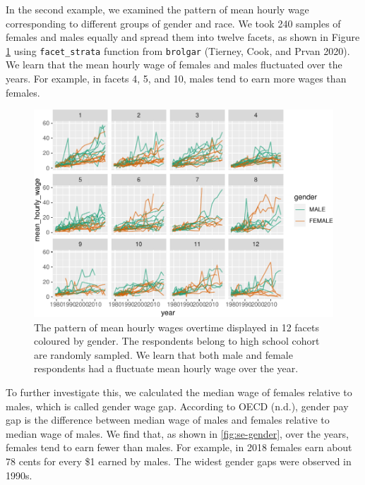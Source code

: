 \documentclass{article}
\begin{document}
In the second example, we examined the pattern of mean hourly wage corresponding to different groups of gender and race. We took 240 samples of females and males equally and spread them into twelve facets, as shown in Figure \ref{fig:plot-gender} using \texttt{facet\_strata} function from \texttt{brolgar} (Tierney, Cook, and Prvan 2020). We learn that the mean hourly wage of females and males fluctuated over the years. For example, in facets 4, 5, and 10, males tend to earn more wages than females.

\begin{figure}
\centering
\includegraphics{figures/plot-gender-1.pdf}
\caption{\label{fig:plot-gender}The pattern of mean hourly wages overtime displayed in 12 facets coloured by gender. The respondents belong to high school cohort are randomly sampled. We learn that both male and female respondents had a fluctuate mean hourly wage over the year.}
\end{figure}

To further investigate this, we calculated the median wage of females relative to males, which is called gender wage gap. According to OECD (n.d.), gender pay gap is the difference between median wage of males and females relative to median wage of males. We find that, as shown in \ref{fig:se-gender}, over the years, females tend to earn fewer than males. For example, in 2018 females earn about 78 cents for every \$1 earned by males. The widest gender gaps were observed in 1990s.
\end{document}
